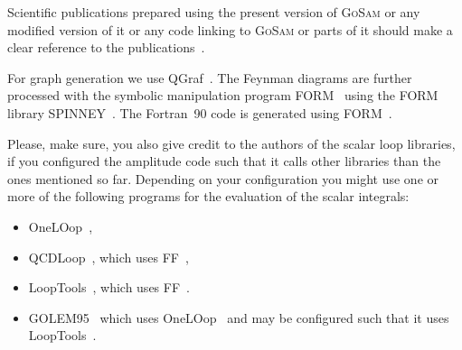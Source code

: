 \documentclass[a4paper]{article}
\begin{document}
Scientific publications prepared using the present version of
\textsc{GoSam} or any modified version of it or any code linking to
\textsc{GoSam} or parts of it should make a clear
reference to the publications~\cite{Cullen:2014yla,Cullen:2011ac}.

For graph generation we use QGraf~\cite{Nogueira:1991ex}.
The Feynman diagrams are further processed with the symbolic manipulation
program FORM~\cite{Kuipers:2012rf,Vermaseren:2000nd} using the FORM library
SPINNEY~\cite{Cullen:2010jv}.
The Fortran~90 code is generated using
FORM~\cite{Kuipers:2012rf,Vermaseren:2000nd}.



Please, make sure, you also give credit to the authors of the scalar
loop libraries, if you configured the amplitude code such that it calls
other libraries than the ones mentioned so far. Depending on your
configuration you might use one or more of the following programs for
the evaluation of the scalar integrals:
\begin{itemize}
\item OneLOop~\cite{vanHameren:2010cp},
\item QCDLoop~\cite{Ellis:2007qk}, which uses FF~\cite{vanOldenborgh:1990yc},
\item LoopTools~\cite{Hahn:1998yk}, which uses FF~\cite{vanOldenborgh:1990yc}.
\item GOLEM95~\cite{Binoth:2008uq,Guillet:2013msa} which uses OneLOop~\cite{vanHameren:2010cp}
   and may be configured such that it uses
   LoopTools~\cite{Hahn:1998yk,vanOldenborgh:1990yc}.
\end{itemize}
\end{document}
